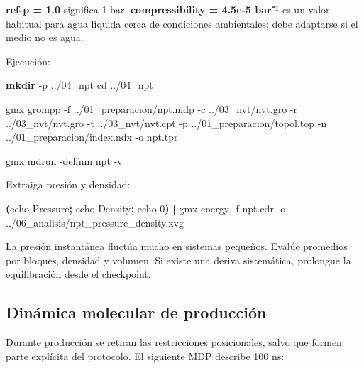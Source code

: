 \documentclass[
  spanish,
  11pt,
  a4paper]{article}
\newenvironment{Shaded}{\begin{snugshade}}{\end{snugshade}}
\newcommand{\AttributeTok}[1]{\textcolor[rgb]{0.13,0.29,0.53}{#1}}
\newcommand{\BuiltInTok}[1]{#1}
\newcommand{\ExtensionTok}[1]{#1}
\newcommand{\FunctionTok}[1]{\textcolor[rgb]{0.13,0.29,0.53}{\textbf{#1}}}
\newcommand{\KeywordTok}[1]{\textcolor[rgb]{0.13,0.29,0.53}{\textbf{#1}}}
\newcommand{\NormalTok}[1]{#1}
\begin{document}
\textbf{ref-p = 1.0} significa 1 bar. \textbf{compressibility = 4.5e-5
bar⁻¹} es un valor habitual para agua líquida cerca de condiciones
ambientales; debe adaptarse si el medio no es agua.

Ejecución:

\begin{Shaded}
\begin{Highlighting}[]
\FunctionTok{mkdir} \AttributeTok{{-}p}\NormalTok{ ../04\_npt}
\BuiltInTok{cd}\NormalTok{ ../04\_npt}

\ExtensionTok{gmx}\NormalTok{ grompp     }\AttributeTok{{-}f}\NormalTok{ ../01\_preparacion/npt.mdp     }\AttributeTok{{-}c}\NormalTok{ ../03\_nvt/nvt.gro     }\AttributeTok{{-}r}\NormalTok{ ../03\_nvt/nvt.gro     }\AttributeTok{{-}t}\NormalTok{ ../03\_nvt/nvt.cpt     }\AttributeTok{{-}p}\NormalTok{ ../01\_preparacion/topol.top     }\AttributeTok{{-}n}\NormalTok{ ../01\_preparacion/index.ndx     }\AttributeTok{{-}o}\NormalTok{ npt.tpr}

\ExtensionTok{gmx}\NormalTok{ mdrun }\AttributeTok{{-}deffnm}\NormalTok{ npt }\AttributeTok{{-}v}
\end{Highlighting}
\end{Shaded}

Extraiga presión y densidad:

\begin{Shaded}
\begin{Highlighting}[]
\KeywordTok{(}\BuiltInTok{echo}\NormalTok{ Pressure}\KeywordTok{;} \BuiltInTok{echo}\NormalTok{ Density}\KeywordTok{;} \BuiltInTok{echo}\NormalTok{ 0}\KeywordTok{)} \KeywordTok{|}
\ExtensionTok{gmx}\NormalTok{ energy }\AttributeTok{{-}f}\NormalTok{ npt.edr }\AttributeTok{{-}o}\NormalTok{ ../06\_analisis/npt\_pressure\_density.xvg}
\end{Highlighting}
\end{Shaded}

La presión instantánea fluctúa mucho en sistemas pequeños. Evalúe
promedios por bloques, densidad y volumen. Si existe una deriva
sistemática, prolongue la equilibración desde el checkpoint.

\subsection{Dinámica molecular de
producción}\label{dinuxe1mica-molecular-de-producciuxf3n}

Durante producción se retiran las restricciones posicionales, salvo que
formen parte explícita del protocolo. El siguiente MDP describe 100 ns:
\end{document}
